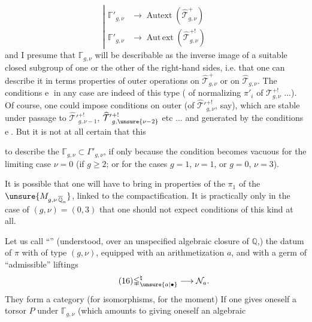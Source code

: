 \[
\tag{15}
\left|
\begin{aligned}
\mathbb{\Gamma}'_{g,\nu}&\longrightarrow\operatorname{Autext}(\widehat{\mathcal T}_{g,\nu}^{+})\\
\mathbb{\Gamma}'_{g,\nu}&\longrightarrow\operatorname{Aut\,ext}(\widehat{\mathcal T}_{g,\nu}^{+!})
\end{aligned}
\right.
\]
and I presume that  $\mathbb{\Gamma}_{g,\nu}$ will
be describable as the inverse image of a
suitable closed subgroup of one
or the other of the right-hand sides, i.e. that one
can describe it in terms  properties
of outer operations on $\widehat{\mathcal T}_{g,\nu}^{+}$ or
on $\widehat{\mathcal T}_{g,\nu}$. The conditions \textcircled{e} in any
case are indeed of this type (
of normalizing  
 $\pi'_i$ of $\mathcal T_{g,\nu}^{+!}$ ...).
Of course, one
could impose conditions on outer
 (of $\widehat{\mathcal T}'{}_{g,\nu}^{+!}$, say),
which are stable under  passage to
$\widehat{\mathcal T}'{}_{g,\nu-1}^{+!}$, $\widehat{\mathcal T}'{}_{g,\unsure{\nu-2}}^{+!}$ etc ... and
generated by the conditions \textcircled{e}. But
it is not at all certain that this



 to describe the 
$\mathbb{\Gamma}_{g,\nu}\subset\Gamma'_{g,\nu}$,
if only because the condition
becomes vacuous for  the limiting case $\nu=0$
(if $g\geq2$; or for the cases $g=1$, $\nu=1$, or $g=0$, $\nu=3$).

It is possible that one will have to
bring in properties of the $\pi_1$ of
the $\unsure{M_{g,\nu\,\overline{\mathbb Q}_a}}$, linked to the compactification.
It is practically only in the case of
$(g,\nu)=(0,3)$ that one should not expect
conditions of this kind at all.

Let us call ``''
(understood, over an unspecified algebraic closure of $\mathbb Q$,)
the datum of  
$\pi$ with  
of type $(g,\nu)$, equipped with an arithmetization
$a$, and with a germ of
``admissible'' liftings
\[
\tag{16}
\mathbb{\Gamma}_{\unsure{a|\bullet}}^{\natural}
\longrightarrow\mathcal N_a.
\]
They form a category (for
isomorphisms, for the moment) If one gives oneself
a torsor $P$ under $\mathbb{\Gamma}_{g,\nu}$
(which  amounts to giving oneself an algebraic

